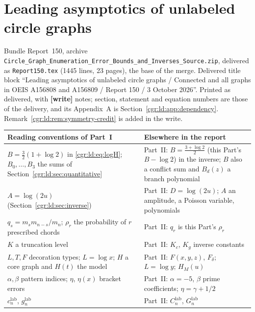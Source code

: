 \documentclass[11pt,letterpaper]{article}
\numberwithin{equation}{section}
\theoremstyle{definition}\newtheorem{definition}[theorem]{Definition}
\theoremstyle{remark}\newtheorem{remark}[theorem]{Remark}
\newcommand{\file}[1]{\nolinkurl{#1}}
\newcommand{\partsource}[1]{\par\noindent\begin{minipage}{\textwidth}\small #1\end{minipage}\par\medskip}
\begin{document}
\part{Leading asymptotics of unlabeled circle graphs}\label{cgr:ld:part}
\partsource{Bundle Report~150, archive \file{Circle_Graph_Enumeration_Error_Bounds_and_Inverses_Source.zip}, delivered as \file{Report150.tex} (1445 lines, 23 pages), the base of the merge. Delivered title block ``Leading asymptotics of unlabeled circle graphs / Connected and all graphs in OEIS A156808 and A156809 / Report 150 / 3 October 2026''. Printed as delivered, with \textbf{[write]} notes; section, statement and equation numbers are those of the delivery, and its Appendix~A is Section~\ref{cgr:ld:app:dependency}. Remark~\ref{cgr:ld:rem:symmetry-credit} is added in the write.}
\begin{center}
\small
\begin{tabular}{@{}>{\raggedright\arraybackslash}p{} >{\raggedright\arraybackslash}p{}@{}}
\toprule
Reading conventions of Part~I & Elsewhere in the report\\
\midrule
$B=\frac32(1+\log2)$ in \eqref{cgr:ld:eq:logH}; $B_0,\ldots,B_3$ the sums of Section~\ref{cgr:ld:sec:quantitative} & Part~II: $B=\frac{3+\log2}2$ (this Part's $B-\log2$) in the inverse; $B$ also a conflict sum and $B_d(z)$ a branch polynomial\\
$A=\log(2u)$ (Section~\ref{cgr:ld:sec:inverse}) & Part~II: $D=\log(2u)$; $A$ an amplitude, a Poisson variable, polynomials\\
$q_s=m_sm_{n-s}/m_n$; $\rho_r$ the probability of $r$ prescribed chords & Part~II: $q_r$ is this Part's $\rho_r$\\
$K$ a truncation level & Part~II: $K_c$, $K_g$ inverse constants\\
$L,T,F$ decoration types; $L=\log x$; $H$ a core graph and $H(t)$ the model & Part~II: $F(x,y,z)$, $F_\delta$; $L=\log y$; $H_M(u)$\\
$\alpha,\beta$ pattern indices; $\eta$, $\eta(x)$ bracket errors & Part~II: $\alpha=-5$, $\beta$ prime coefficients; $\eta=\gamma+1/2$\\
$c_n^{\mathrm{lab}}$, $g_n^{\mathrm{lab}}$ & Part~II: $C_n^{\mathrm{lab}}$, $G_n^{\mathrm{lab}}$\\
\bottomrule
\end{tabular}
\end{center}
\end{document}
